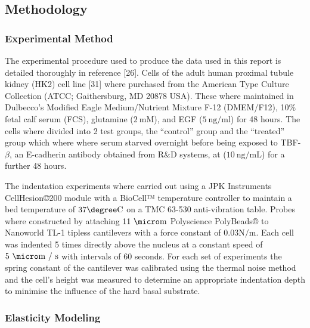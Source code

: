 \documentclass[
  paper=a4,
  ,captions=tableheading
]{scrartcl}
\begin{document}
\subsection{Methodology}\label{methodology}

\subsubsection{Experimental Method}\label{experimental-method}

The experimental procedure used to produce the data used in this report
is detailed thoroughly in reference {[}26{]}. Cells of the adult human
proximal tubule kidney (HK2) cell line {[}31{]} where purchased from the
American Type Culture Collection (ATCC; Gaithersburg, MD 20878 USA).
These where maintained in Dulbecco's Modified Eagle Medium/Nutrient
Mixture F-12 (DMEM/F12), 10\% fetal calf serum (FCS), glutamine
(\(2 \ \text{mM}\)), and EGF (\(5 \ \text{ng/ml}\)) for 48 hours. The
cells where divided into 2 test groups, the ``control'' group and the
``treated'' group which where where serum starved overnight before being
exposed to TBF-\(\beta\), an E-cadherin antibody obtained from R\&D
systems, at (\(10 \ \text{ng/mL}\)) for a further 48 hours.

The indentation experiments where carried out using a JPK Instruments
CellHesion©200 module with a BioCell™ temperature controller to maintain
a bed temperature of \(37 \degree \text{C}\) on a TMC 63-530
anti-vibration table. Probes where constructed by attaching
\(11\ \micro \text{m}\) Polyscience PolyBeads® to Nanoworld TL-1 tipless
cantilevers with a force constant of \(0.03 \text{N/m}\). Each cell was
indented 5 times directly above the nucleus at a constant speed of
\(5\ \micro \text{m / s}\) with intervals of 60 seconds. For each set of
experiments the spring constant of the cantilever was calibrated using
the thermal noise method and the cell's height was measured to determine
an appropriate indentation depth to minimise the influence of the hard
basal substrate.

\subsubsection{Elasticity Modeling}\label{elasticity-modeling}
\end{document}
